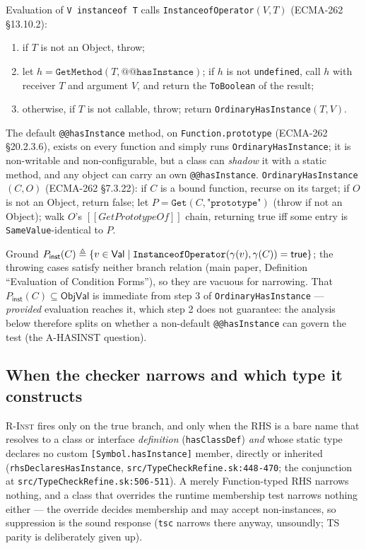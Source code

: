 \documentclass[11pt]{article}
\newcommand{\ObjVal}{\mathsf{ObjVal}}
\newcommand{\realize}{\gamma}
\newcommand{\ecma}[1]{ECMA-262 \S#1}
\newcommand{\intm}[1]{[[#1]]}
\begin{document}
Evaluation of \texttt{V instanceof T} calls
\texttt{InstanceofOperator}$(V, T)$ (\ecma{13.10.2}):
\begin{enumerate}
\item if $T$ is not an Object, throw;
\item let $h = \texttt{GetMethod}(T, \texttt{@@hasInstance})$; if $h$
  is not \texttt{undefined}, call $h$ with receiver $T$ and argument
  $V$, and return the \texttt{ToBoolean} of the result;
\item otherwise, if $T$ is not callable, throw; return
  \texttt{OrdinaryHasInstance}$(T, V)$.
\end{enumerate}
The default \texttt{@@hasInstance} method, on
\texttt{Function.prototype}
(\ecma{20.2.3.6}), exists on every function and simply runs
\texttt{OrdinaryHasInstance}; it is non-writable and non-configurable,
but a class can \emph{shadow} it with a static method, and any object can
carry an own \texttt{@@hasInstance}. \texttt{OrdinaryHasInstance}$(C,O)$
(\ecma{7.3.22}): if $C$ is a bound function, recurse on its target; if
$O$ is not an Object, return \textsf{false}; let
$P = \texttt{Get}(C, \texttt{"prototype"})$ (throw if not an Object);
walk $O$'s $\intm{GetPrototypeOf}$ chain, returning \textsf{true} iff
some entry is \texttt{SameValue}-identical to $P$.

Ground $P_{\mathsf{inst}}(C) \triangleq \{v \in \Val \mid
\texttt{InstanceofOperator}(\realize(v), \realize(C)) =
\textsf{true}\}$; the throwing cases satisfy neither branch relation
(main paper, Definition ``Evaluation of Condition Forms''), so they are
vacuous for narrowing. That
$P_{\mathsf{inst}}(C) \subseteq \ObjVal$ is immediate from step 3 of
\texttt{OrdinaryHasInstance} — \emph{provided} evaluation reaches it,
which step 2 does not guarantee: the analysis below therefore splits on
whether a non-default \texttt{@@hasInstance} can govern the
test (the A-HASINST question).

\subsection{When the checker narrows and which type it constructs}

\textsc{R-Inst} fires only on the true branch, and only when the RHS is
a bare name that resolves to a class or interface \emph{definition}
(\texttt{hasClassDef}) \emph{and} whose static type declares no custom
\texttt{[Symbol.hasInstance]} member, directly or inherited
(\texttt{rhsDeclaresHasInstance},
\texttt{src/TypeCheckRefine.sk:448-470}; the conjunction at
\texttt{src/TypeCheckRefine.sk:506-511}). A merely Function-typed RHS
narrows nothing, and a class that overrides the runtime membership test
narrows nothing either — the override decides membership and may accept
non-instances, so suppression is the sound response
(\texttt{tsc} narrows there anyway, unsoundly; TS parity is
deliberately given up).
\end{document}
